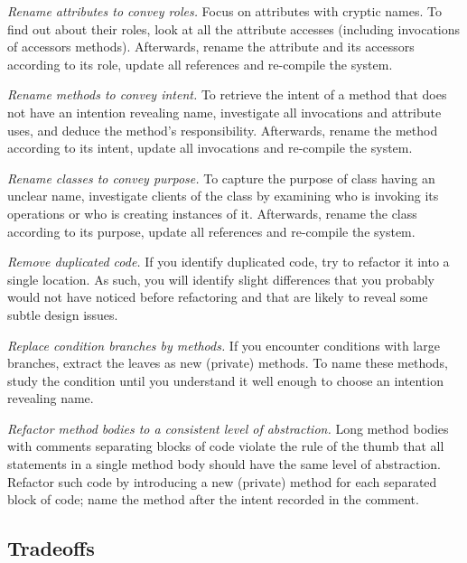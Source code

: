 \documentclass[a4paper,10pt,twoside]{book}
\begin{document}
\begin{bulletlist}
\item \emph{Rename attributes to convey roles.}
Focus on attributes with cryptic names. To find out about their roles, look at all the attribute accesses (including invocations of accessors methods). Afterwards, rename the attribute and its accessors according to its role, update all references and re-compile the system.

\item \emph{Rename methods to convey intent.}
To retrieve the intent of a method that does not have an intention revealing name, investigate all invocations and attribute uses, and deduce the method's responsibility. Afterwards, rename the method according to its intent, update all invocations and re-compile the system.

\item \emph{Rename classes to convey purpose.}
To capture the purpose of class having an unclear name, investigate clients of the class by examining who is invoking its operations or who is creating instances of it. Afterwards, rename the class according to its purpose, update all references and re-compile the system.

\item \emph{Remove duplicated code.}
If you identify duplicated code, try to refactor it into a single location. As such, you will identify slight differences that you probably would not have noticed before refactoring and that are likely to reveal some subtle design issues. 

\item \emph{Replace condition branches by methods.}
If you encounter conditions with large branches, extract the leaves as new (private) methods. To name these methods, study the condition until you understand it well enough to choose an intention revealing name.

\item \emph{Refactor method bodies to a consistent level of abstraction.}
Long method bodies with comments separating blocks of code violate the rule of the thumb that all statements in a single method body should have the same level of abstraction. Refactor such code by introducing a new (private) method for each separated block of code; name the method after the intent recorded in the comment.
\end{bulletlist}

\subsection*{Tradeoffs}
\end{document}
